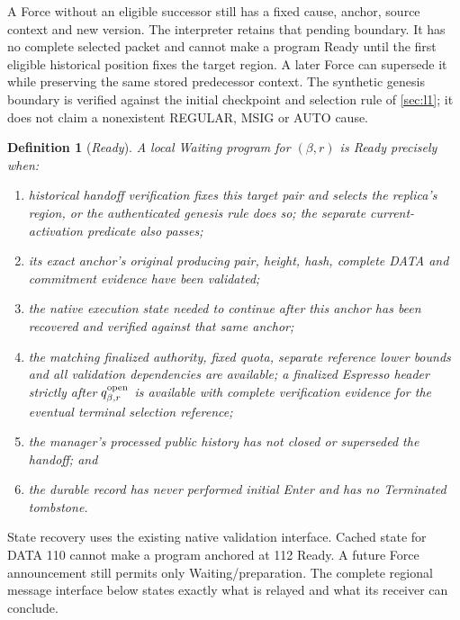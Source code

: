 \documentclass[11pt,a4paper]{article}
\newcommand{\defterm}[1]{\textcolor{rrBlue}{\textit{#1}}}
\newtheorem{definition}{Definition}[section]
\begin{document}
A Force without an eligible successor still has a fixed cause,
anchor, source context and new version. The interpreter retains that
pending boundary. It has no complete selected packet and cannot make
a program Ready until the first eligible historical position fixes
the target region. A later Force can supersede it while preserving the
same stored predecessor context. The synthetic genesis boundary is
verified against the initial checkpoint and selection rule of
\cref{sec:l1}; it does not claim a nonexistent REGULAR, MSIG or AUTO
cause.

\begin{definition}[\defterm{Ready}]
\label{def:ready}
A local Waiting program for $(\beta,r)$ is Ready precisely when:
\begin{enumerate}[label=(\roman*)]
\item historical handoff verification fixes this target pair and selects the
replica's region, or the authenticated genesis rule does so; the separate
current-activation predicate also passes;
\item its exact anchor's original producing pair, height, hash,
complete DATA and commitment evidence have been validated;
\item the native execution state needed to continue after this
anchor has been recovered and verified against that same anchor;
\item the matching finalized authority, fixed quota, separate
reference lower bounds and all validation dependencies are available;
a finalized Espresso header strictly after $q^{\rm open}_{\beta,r}$ is
available with complete verification evidence for the eventual terminal
selection reference;
\item the manager's processed public history has not closed or
superseded the handoff; and
\item the durable record has never performed initial Enter and has
no Terminated tombstone.
\end{enumerate}
\end{definition}

State recovery uses the existing native validation interface. Cached state
for DATA 110 cannot make a program anchored at 112 Ready. A future Force
announcement still permits only Waiting/preparation. The complete regional
message interface below states exactly what is relayed and what its
receiver can conclude.


\end{document}
